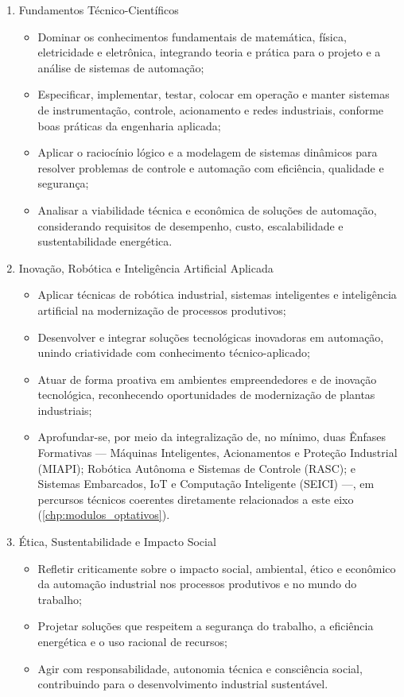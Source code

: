 \begin{enumerate}
\item Fundamentos Técnico-Científicos

\begin{itemize}
    \item Dominar os conhecimentos fundamentais de matemática, física, eletricidade e eletrônica, integrando teoria e prática para o projeto e a análise de sistemas de automação;
    \item Especificar, implementar, testar, colocar em operação e manter sistemas de instrumentação, controle, acionamento e redes industriais, conforme boas práticas da engenharia aplicada;
    \item Aplicar o raciocínio lógico e a modelagem de sistemas dinâmicos para resolver problemas de controle e automação com eficiência, qualidade e segurança;
    \item Analisar a viabilidade técnica e econômica de soluções de automação, considerando requisitos de desempenho, custo, escalabilidade e sustentabilidade energética.
\end{itemize}

\item Inovação, Robótica e Inteligência Artificial Aplicada

\begin{itemize}
    \item Aplicar técnicas de robótica industrial, sistemas inteligentes e inteligência artificial na modernização de processos produtivos;
    \item Desenvolver e integrar soluções tecnológicas inovadoras em automação, unindo criatividade com conhecimento técnico-aplicado;
    \item Atuar de forma proativa em ambientes empreendedores e de inovação tecnológica, reconhecendo oportunidades de modernização de plantas industriais;
    \item Aprofundar-se, por meio da integralização de, no mínimo, duas Ênfases Formativas — Máquinas Inteligentes, Acionamentos e Proteção Industrial (MIAPI); Robótica Autônoma e Sistemas de Controle (RASC); e Sistemas Embarcados, IoT e Computação Inteligente (SEICI) —, em percursos técnicos coerentes diretamente relacionados a este eixo (\autoref{chp:modulos_optativos}).
\end{itemize}

\item Ética, Sustentabilidade e Impacto Social

\begin{itemize}
    \item Refletir criticamente sobre o impacto social, ambiental, ético e econômico da automação industrial nos processos produtivos e no mundo do trabalho;
    \item Projetar soluções que respeitem a segurança do trabalho, a eficiência energética e o uso racional de recursos;
    \item Agir com responsabilidade, autonomia técnica e consciência social, contribuindo para o desenvolvimento industrial sustentável.
\end{itemize}


\end{enumerate}
